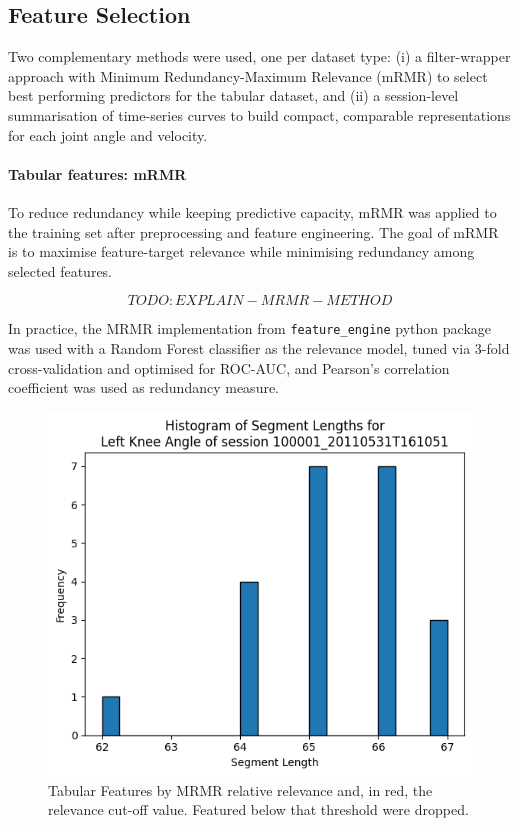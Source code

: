 \subsection{Feature Selection}\label{subsec:method-feature-selection}
Two complementary methods were used, one per dataset type: (i) a filter-wrapper approach with Minimum Redundancy-Maximum Relevance (mRMR) to select best performing predictors for the tabular dataset, and (ii) a session-level summarisation of time-series curves to build compact, comparable representations for each joint angle and velocity.

\paragraph{Tabular features: mRMR}
To reduce redundancy while keeping predictive capacity, mRMR \citep{DING2005} was applied to the training set after preprocessing and feature engineering. The goal of mRMR is to maximise feature-target relevance while minimising redundancy among selected features.

\begin{equation}
TODO: EXPLAIN-MRMR-METHOD
\end{equation}

In practice, the MRMR implementation from \texttt{feature\_engine} python package was used with a Random Forest classifier as the relevance model, tuned via 3-fold cross-validation and optimised for ROC-AUC, and Pearson's correlation coefficient was used as redundancy measure.

\begin{figure}[ht]
    \centering
    \includegraphics[width=0.5\columnwidth]{images/hist_segment_lengths_L_knee_angle.png}
    \caption[Tabular Features by MRMR relative relevance]{Tabular Features by MRMR relative relevance and, in red, the relevance cut-off value. Featured below that threshold were dropped.\label{fig:met-mrm-feat-sel}}
\end{figure}

